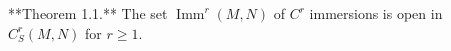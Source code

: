 **Theorem 1.1.** The set $\operatorname{Imm}^r(M,N)$ of $C^r$ immersions is open in $C^r_S(M,N)$ for $r \geq 1$.

